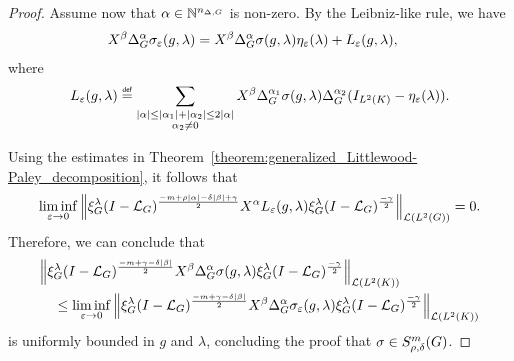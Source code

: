 \begin{proof}
    Assume now that $\alpha \in \mathbb{N}^{n_{\Delta, G}}$ is non-zero.
    By the Leibniz-like rule,
    we have
    \begin{align*}
        \LeftDifferentialOperator \beta \DifferenceOperatorOrder \alpha &\sigma_\epsilon(g, \lambda)
        =
        \LeftDifferentialOperator \beta \DifferenceOperatorOrder \alpha \sigma(g, \lambda) \eta_\epsilon(\lambda)
        +
        L_\epsilon(g, \lambda),
    \end{align*}
    where
    \begin{align*}
        L_\epsilon(g, \lambda) \defeq
        \sum_{\substack{\abs \alpha \leq \abs {\alpha_1} + \abs {\alpha_2} \leq 2 \abs \alpha\\ \alpha_2 \neq 0}}
        \LeftDifferentialOperator \beta \DifferenceOperatorOrder {\alpha_1} \sigma(g, \lambda)
        \DifferenceOperatorOrder {\alpha_2} (\Id {\Lebesgue 2 \CompactGroup} - \eta_\epsilon(\lambda)).
    \end{align*}

    Using the estimates in Theorem~\ref{theorem:generalized_Littlewood-Paley_decomposition},
    it follows that
    \begin{align*}
        \liminf_{\epsilon \to 0}
        \norm [\Lin {\Lebesgue 2 \Group}] {%
            \Rep \lambda \BesselPotential {-m + \rho \abs \alpha - \delta \abs \beta + \gamma}
            \LeftDifferentialOperator \alpha L_\epsilon(g, \lambda)
            \Rep \lambda \BesselPotential {-\gamma}
        } = 0.
    \end{align*}
    Therefore,
    we can conclude that
    \begin{align*}
        &\norm [\Lin {\Lebesgue 2 \CompactGroup}] {%
            \Rep \lambda \BesselPotential {-m + \gamma - \delta \abs \beta}
            \LeftDifferentialOperator \beta
            \DifferenceOperatorOrder \alpha
            \sigma(g, \lambda)
            \Rep \lambda \BesselPotential {-\gamma}
        }
        \\
        &\quad \leq
        \liminf_{\epsilon \to 0}
        \norm [\Lin {\Lebesgue 2 \CompactGroup}] {%
            \Rep \lambda \BesselPotential {-m + \gamma - \delta \abs \beta}
            \LeftDifferentialOperator \beta
            \DifferenceOperatorOrder \alpha
            \sigma_\epsilon(g, \lambda)
            \Rep \lambda \BesselPotential {-\gamma}
        }
    \end{align*}
    is uniformly bounded in $g$ and $\lambda$,
    concluding the proof that $\sigma \in S^{m}_{\rho, \delta}(G)$.
\end{proof}

